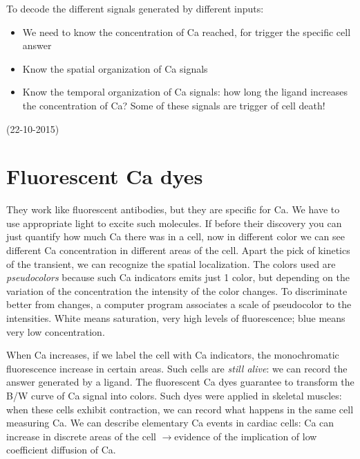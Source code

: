 \documentclass[a4paper, 12pt]{book}
\newcommand{\lfreccia}{\ensuremath{\longrightarrow}}
\begin{document}
To decode the different signals generated by different inputs:
\begin{itemize}
\item{We need to know the concentration of Ca reached, for trigger the specific cell answer}
\item{Know the spatial organization of Ca signals}
\item{Know the temporal organization of Ca signals: how long the ligand increases the concentration of Ca? Some of these signals are trigger of cell death!}
\end{itemize}

(22-10-2015)

\section{Fluorescent Ca dyes}

They work like fluorescent antibodies, but they are specific for Ca. We have to use appropriate light to excite such molecules. If before their discovery you can just quantify how much Ca there was in a cell, now in different color we can see different Ca concentration in different areas of the cell. Apart the pick of kinetics of the transient, we can recognize the spatial localization. The colors used are \emph{pseudocolors} because such Ca indicators emits just 1 color, but depending on the variation of the concentration the intensity of the color changes. To discriminate better from changes, a computer program associates a scale of pseudocolor to the intensities. White means saturation, very high levels of fluorescence; blue means very low concentration.

When Ca increases, if we  label the cell with Ca indicators, the monochromatic fluorescence increase in certain areas. Such cells are \emph{still alive}: we can record the answer generated by a ligand. The fluorescent Ca dyes guarantee to transform the B/W curve of Ca signal into colors. Such dyes were applied in skeletal muscles: when these cells exhibit contraction, we can record what happens in the same cell measuring Ca. We can describe elementary Ca events in cardiac cells: Ca can increase in discrete areas of the cell \lfreccia evidence of the implication of low coefficient diffusion of Ca. 
\end{document}
